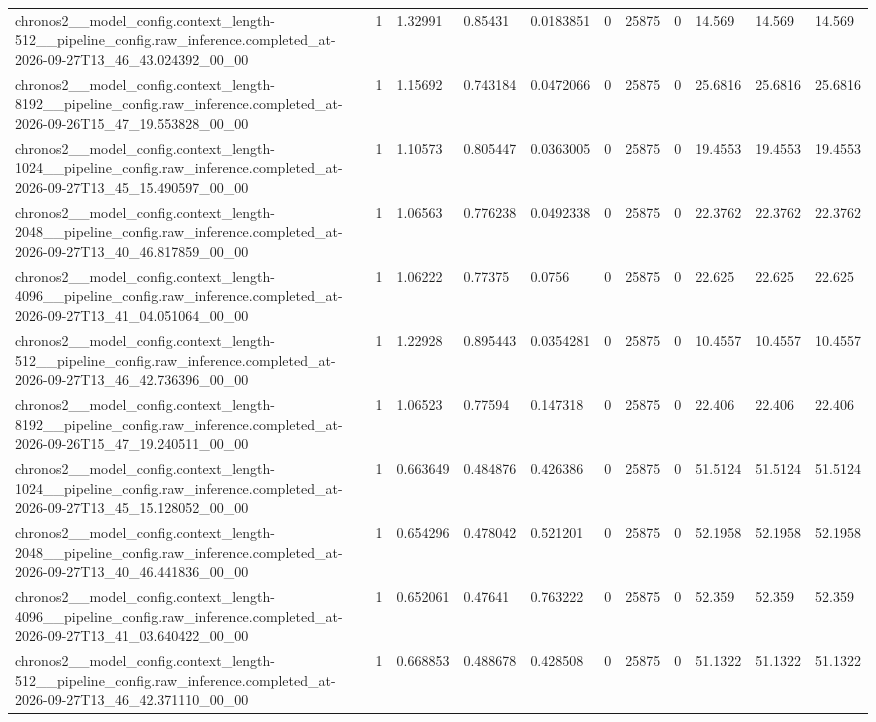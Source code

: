 \begin{tabular}{lllllllllll}
chronos2\_\_model\_config.context\_length-512\_\_pipeline\_config.raw\_inference.completed\_at-2026-09-27T13\_46\_43.024392\_00\_00 & 1 & 1.32991 & 0.85431 & 0.0183851 & 0 & 25875 & 0 & 14.569 & 14.569 & 14.569 \\
chronos2\_\_model\_config.context\_length-8192\_\_pipeline\_config.raw\_inference.completed\_at-2026-09-26T15\_47\_19.553828\_00\_00 & 1 & 1.15692 & 0.743184 & 0.0472066 & 0 & 25875 & 0 & 25.6816 & 25.6816 & 25.6816 \\
chronos2\_\_model\_config.context\_length-1024\_\_pipeline\_config.raw\_inference.completed\_at-2026-09-27T13\_45\_15.490597\_00\_00 & 1 & 1.10573 & 0.805447 & 0.0363005 & 0 & 25875 & 0 & 19.4553 & 19.4553 & 19.4553 \\
chronos2\_\_model\_config.context\_length-2048\_\_pipeline\_config.raw\_inference.completed\_at-2026-09-27T13\_40\_46.817859\_00\_00 & 1 & 1.06563 & 0.776238 & 0.0492338 & 0 & 25875 & 0 & 22.3762 & 22.3762 & 22.3762 \\
chronos2\_\_model\_config.context\_length-4096\_\_pipeline\_config.raw\_inference.completed\_at-2026-09-27T13\_41\_04.051064\_00\_00 & 1 & 1.06222 & 0.77375 & 0.0756 & 0 & 25875 & 0 & 22.625 & 22.625 & 22.625 \\
chronos2\_\_model\_config.context\_length-512\_\_pipeline\_config.raw\_inference.completed\_at-2026-09-27T13\_46\_42.736396\_00\_00 & 1 & 1.22928 & 0.895443 & 0.0354281 & 0 & 25875 & 0 & 10.4557 & 10.4557 & 10.4557 \\
chronos2\_\_model\_config.context\_length-8192\_\_pipeline\_config.raw\_inference.completed\_at-2026-09-26T15\_47\_19.240511\_00\_00 & 1 & 1.06523 & 0.77594 & 0.147318 & 0 & 25875 & 0 & 22.406 & 22.406 & 22.406 \\
chronos2\_\_model\_config.context\_length-1024\_\_pipeline\_config.raw\_inference.completed\_at-2026-09-27T13\_45\_15.128052\_00\_00 & 1 & 0.663649 & 0.484876 & 0.426386 & 0 & 25875 & 0 & 51.5124 & 51.5124 & 51.5124 \\
chronos2\_\_model\_config.context\_length-2048\_\_pipeline\_config.raw\_inference.completed\_at-2026-09-27T13\_40\_46.441836\_00\_00 & 1 & 0.654296 & 0.478042 & 0.521201 & 0 & 25875 & 0 & 52.1958 & 52.1958 & 52.1958 \\
chronos2\_\_model\_config.context\_length-4096\_\_pipeline\_config.raw\_inference.completed\_at-2026-09-27T13\_41\_03.640422\_00\_00 & 1 & 0.652061 & 0.47641 & 0.763222 & 0 & 25875 & 0 & 52.359 & 52.359 & 52.359 \\
chronos2\_\_model\_config.context\_length-512\_\_pipeline\_config.raw\_inference.completed\_at-2026-09-27T13\_46\_42.371110\_00\_00 & 1 & 0.668853 & 0.488678 & 0.428508 & 0 & 25875 & 0 & 51.1322 & 51.1322 & 51.1322 \\

\end{tabular}
